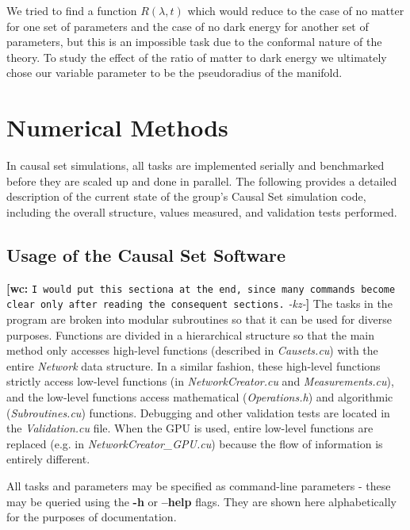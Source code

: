 \documentclass[preprint,notitlepage,amsmath,amssymb,floatfix]{revtex4-1}
\newcommand{\XXX}[3]{{\bf [#1: } {\tt #3} {\it -#2-}{\bf ]}}
\begin{document}
\noindent We tried to find a function $R\left(\lambda,t\right)$ which would reduce to the case of no matter for one set of parameters and the case of no dark energy for another set of parameters, but this is an impossible task due to the conformal nature of the theory.  To study the effect of the ratio of matter to dark energy we ultimately chose our variable parameter to be the pseudoradius of the manifold.

\section{Numerical Methods}
In causal set simulations, all tasks are implemented serially and benchmarked before they are scaled up and done in parallel.
The following provides a detailed description of the current state of the group's Causal Set simulation code, including the overall structure, values measured, and validation tests performed.
\subsection{Usage of the Causal Set Software}
\XXX{wc}{kz}{I would put this sectiona at the end, since many commands become clear only after reading the consequent sections.}
The tasks in the program are broken into modular subroutines so that it can be used for diverse purposes.
Functions are divided in a hierarchical structure so that the main method only accesses high-level functions (described in \textit{Causets.cu}) with the entire \textit{Network} data structure.
In a similar fashion, these high-level functions strictly access low-level functions (in \textit{NetworkCreator.cu} and \textit{Measurements.cu}), and the low-level functions access mathematical (\textit{Operations.h}) and algorithmic (\textit{Subroutines.cu}) functions.
Debugging and other validation tests are located in the \textit{Validation.cu} file.
When the GPU is used, entire low-level functions are replaced (e.g. in \textit{NetworkCreator\_GPU.cu}) because the flow of information is entirely different. \par
All tasks and parameters may be specified as command-line parameters - these may be queried using the \textbf{-h} or \textbf{--help} flags.
They are shown here alphabetically for the purposes of documentation.
\end{document}
